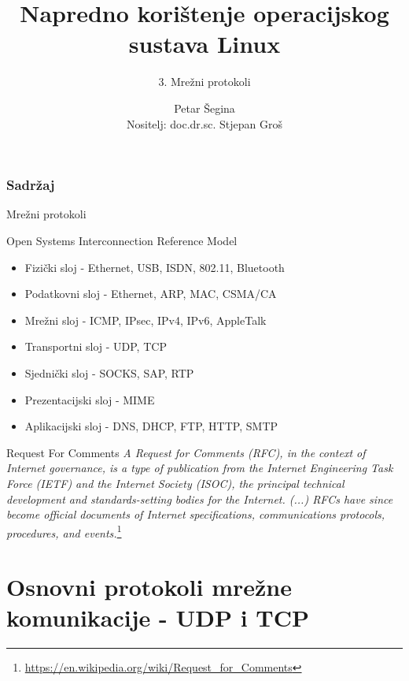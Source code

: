 \documentclass[t]{beamer}
\date{\todayiso}
\title[NKOSL]{Napredno korištenje operacijskog sustava Linux}
\author[Petar Šegina]{Petar Šegina\\ {\small Nositelj: doc.dr.sc. Stjepan Groš}}
\subtitle{3. Mrežni protokoli}
\institute[FER]{Sveučilište u Zagrebu\\Fakultet elektrotehnike i računarstva}
\begin{document}
{
	\begin{frame}
		\maketitle
	\end{frame}
}

\begin{frame}
	\frametitle{Sadržaj}
	\tableofcontents
\end{frame}

\begin{frame}
	\vspace*{\fill}
		\begin{center}
			\Huge{Mrežni protokoli}
		\end{center}
	\vspace*{\fill}
\end{frame}

\begin{frame}{Open Systems Interconnection Reference Model}
    \begin{itemize}
        \item Fizički sloj - Ethernet, USB, ISDN, 802.11, Bluetooth
        \item Podatkovni sloj - Ethernet, ARP, MAC, CSMA/CA 
        \item Mrežni sloj - ICMP, IPsec, IPv4, IPv6, AppleTalk
        \item Transportni sloj - UDP, TCP
        \item Sjednički sloj - SOCKS, SAP, RTP
        \item Prezentacijski sloj - MIME
        \item Aplikacijski sloj - DNS, DHCP, FTP, HTTP, SMTP
    \end{itemize}
\end{frame}

\begin{frame}{Request For Comments}
    \textit{A Request for Comments (RFC), in the context of Internet governance, is a type of publication from the Internet Engineering Task Force (IETF) and the Internet Society (ISOC), the principal technical development and standards-setting bodies for the Internet. (...) RFCs have since become official documents of Internet specifications, communications protocols, procedures, and events.}\footnote{\url{https://en.wikipedia.org/wiki/Request_for_Comments}}
\end{frame}

\section{Osnovni protokoli mrežne komunikacije - UDP i TCP}
\end{document}

